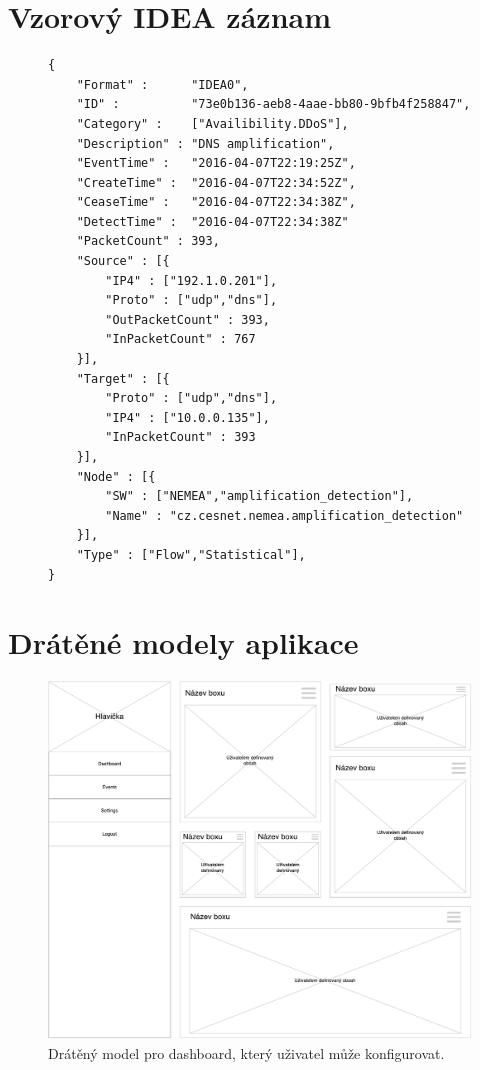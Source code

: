 \chapter{Vzorový IDEA záznam}
\label{code:idea}

\begin{figure}[ht]
\lstset{basicstyle=\small,style=JSON}
\begin{lstlisting}
{
    "Format" :      "IDEA0",
    "ID" :          "73e0b136-aeb8-4aae-bb80-9bfb4f258847",
    "Category" :    ["Availibility.DDoS"],
    "Description" : "DNS amplification",
    "EventTime" :   "2016-04-07T22:19:25Z",
    "CreateTime" :  "2016-04-07T22:34:52Z",
    "CeaseTime" :   "2016-04-07T22:34:38Z",
    "DetectTime" :  "2016-04-07T22:34:38Z"
    "PacketCount" : 393,
    "Source" : [{
        "IP4" : ["192.1.0.201"],
        "Proto" : ["udp","dns"],
        "OutPacketCount" : 393,
        "InPacketCount" : 767
    }],
    "Target" : [{
        "Proto" : ["udp","dns"],
        "IP4" : ["10.0.0.135"],
        "InPacketCount" : 393
    }],
    "Node" : [{
        "SW" : ["NEMEA","amplification_detection"],
        "Name" : "cz.cesnet.nemea.amplification_detection"
    }],
    "Type" : ["Flow","Statistical"],
}
\end{lstlisting}
\end{figure}


\chapter{Drátěné modely aplikace}

\begin{figure}[ht]
    \centering
    \includegraphics[width=1\textwidth]{fig/wf_dashboard.pdf}
    \caption{Drátěný model pro dashboard, který uživatel může konfigurovat.} \label{wf:dashboard}
\end{figure}

